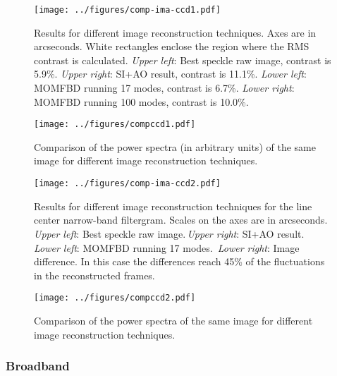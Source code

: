 \begin{figure}[p]
\begin{center}
\texttt{[image: ../figures/comp-ima-ccd1.pdf]}
\caption{Results for different image reconstruction techniques. Axes are in arcseconds. White rectangles enclose the region where the RMS contrast is calculated. \emph{Upper left}: Best speckle raw image, contrast is 5.9\%. \emph{Upper right}: SI+AO result, contrast is 11.1\%. \emph{Lower left}: MOMFBD running 17 modes, contrast is 6.7\%. \emph{Lower right}: MOMFBD running 100 modes, contrast is 10.0\%.}
\label{com:ima1}
\end{center}
\begin{center}
\texttt{[image: ../figures/compccd1.pdf]}
\caption{Comparison of the power spectra (in arbitrary units) of the same image for different  image reconstruction techniques.} 
\label{com:pow1}
\end{center}
\end{figure}  

\begin{figure}[p]
\begin{center}
\texttt{[image: ../figures/comp-ima-ccd2.pdf]}
\caption{Results for different image reconstruction techniques for the line center narrow-band filtergram. Scales on the axes are in arcseconds. \emph{Upper left}: Best speckle raw image.\,\emph{Upper right}: SI+AO result. \emph{Lower left}: MOMFBD running 17 modes. \,\emph{Lower right}: Image difference. In this case the differences reach 45\% of the fluctuations in the reconstructed frames.}
\label{com:ima2}
\end{center}
\vspace{-1cm}
\begin{center}
\texttt{[image: ../figures/compccd2.pdf]}
\caption{Comparison of the power spectra of the same image for different image reconstruction techniques.}
\label{com:pow2}
\end{center}
\end{figure}  

\subsubsection*{Broadband}

